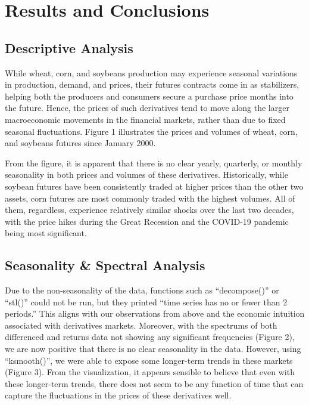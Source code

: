 \documentclass[11pt]{article}
\begin{document}
\section{Results and Conclusions}

\subsection{Descriptive Analysis}

While wheat, corn, and soybeans production may experience seasonal variations in production, demand, and prices, their futures contracts come in as stabilizers, helping both the producers and consumers secure a purchase price months into the future. Hence, the prices of such derivatives tend to move along the larger macroeconomic movements in the financial markets, rather than due to fixed seasonal fluctuations. Figure 1 illustrates the prices and volumes of wheat, corn, and soybeans futures since January 2000.

From the figure, it is apparent that there is no clear yearly, quarterly, or monthly seasonality in both prices and volumes of these derivatives. Historically, while soybean futures have been consistently traded at higher prices than the other two assets, corn futures are most commonly traded with the highest volumes. All of them, regardless, experience relatively similar shocks over the last two decades, with the price hikes during the Great Recession and the COVID-19 pandemic being most significant.

\subsection{Seasonality \& Spectral Analysis}

Due to the non-seasonality of the data, functions such as ``decompose()'' or ``stl()'' could not be run, but they printed ``time series has no or fewer than 2 periods.'' This aligns with our observations from above and the economic intuition associated with derivatives markets. Moreover, with the spectrums of both differenced and returns data not showing any significant frequencies (Figure 2), we are now positive that there is no clear seasonality in the data. However, using ``ksmooth()'', we were able to expose some longer-term trends in these markets (Figure 3). From the visualization, it appears sensible to believe that even with these longer-term trends, there does not seem to be any function of time that can capture the fluctuations in the prices of these derivatives well.
\end{document}
